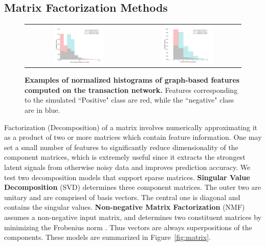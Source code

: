 \documentclass{article} %
\begin{document}
\subsection{Matrix Factorization Methods}
\begin{figure}[!thb]
\centering
\caption{\textbf{Examples of normalized histograms of graph-based features computed on the transaction network.}  Features corresponding to the simulated ``Positive" class are red, while the ``negative" class are in blue.  }
\begin{tabular}{cc}
\includegraphics[width=0.5\textwidth]{figs/hist_out.png} & 
\includegraphics[width=0.5\textwidth]{figs/hist_dist.png}  
\end{tabular}
\label{fig:hist}
\end{figure}
Factorization (Decomposition) of a matrix involves numerically approximating it as a product of two or more matrices which contain feature information. One may set a small number of features to significantly reduce dimensionality of the component matrices, which is extremely useful since it extracts the strongest latent signals from otherwise noisy data and improves prediction accuracy. We test two decomposition models that support sparse matrices. 
\textbf{Singular Value Decomposition} (SVD) determines three component matrices. The outer two are unitary and are comprised of basis vectors. The central one is diagonal and contains the singular values.
\textbf{Non-negative Matrix Factorization} (NMF) assumes a non-negative input matrix, and determines two constituent matrices by minimizing the Frobenius norm \cite{scikit-learn}. Thus vectors are always superpositions of the components. These models are summarized in Figure~\ref{fig:matrix}.
\end{document}

